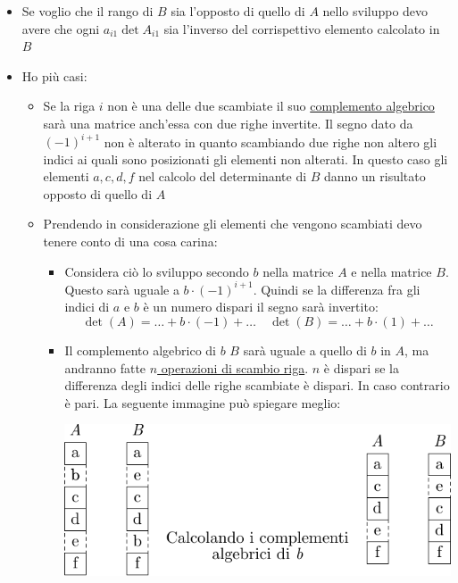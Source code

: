 \documentclass[12pt,a4paper,oneside]{article}
\begin{document}
\begin{itemize}
	\item Se voglio che il rango di $ B $ sia l'opposto di quello di $ A $ nello sviluppo devo avere che ogni $ a_{i 1} \det A_{i 1} $ sia l'inverso del corrispettivo elemento calcolato in $ B $
	\item Ho più casi:
	      \begin{itemize}
		      \item Se la riga $ i $ non è una delle due scambiate il suo \underline{complemento algebrico} sarà una matrice anch'essa con due righe invertite. Il segno dato da $ \left( -1 \right) ^{i+1} $ non è alterato in quanto scambiando due righe non altero gli indici ai quali sono posizionati gli elementi non alterati.
		            \vskip3mm
		            In questo caso gli elementi  $a,c,d,f$ nel calcolo del determinante di $ B $ danno un risultato opposto di quello di $ A $
		      \item Prendendo in considerazione gli elementi che vengono scambiati devo tenere conto di una cosa carina:
		            \begin{itemize}
			            \item Considera ciò lo sviluppo secondo $ b $ nella matrice $ A $ e nella matrice $ B $. Questo sarà uguale a $ b \cdot \left( -1 \right) ^{i+1} $. Quindi se la differenza fra gli indici di $ a $ e $ b $ è un numero dispari il segno sarà invertito:
			                  \[
				                  \det \left( A \right)  = \ldots + b \cdot\left( -1 \right)+\ldots \quad \det \left( B \right)  = \ldots + b \cdot \left( 1 \right) +\ldots
			                  \]
			            \item Il complemento algebrico di $b$ $ B $ sarà uguale a quello di $ b $ in $ A $, ma andranno fatte \underline{$ n $ operazioni di scambio riga}. $ n $ è dispari se la differenza degli indici delle righe scambiate è dispari. In caso contrario è pari. La seguente immagine può spiegare meglio:
			                  \begin{center}
				                  \includegraphics{Images/DimDeterminante1.pdf}

\end{center}
\end{itemize}
\end{itemize}
\end{itemize}
\end{document}
